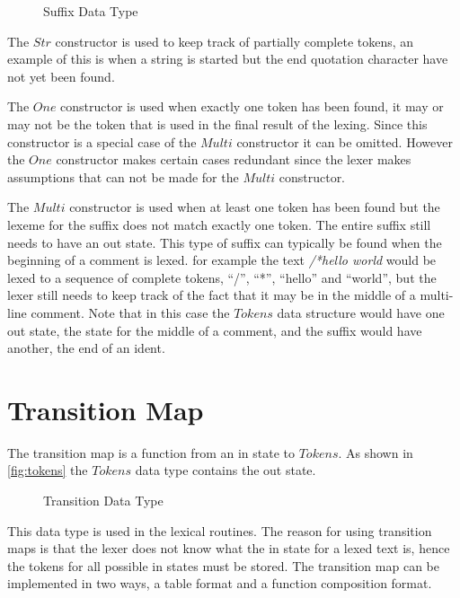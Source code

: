 \begin{figure}[h!]
  
  \caption{Suffix Data Type\label{fig:suff}}
\end{figure}

The $Str$ constructor is used to keep track of partially complete tokens, an
example of this is when a string is started but the end quotation character have
not yet been found.

The $One$ constructor is used when exactly one token has been found, it may or
may not be the token that is used in the final result of the lexing. Since this
constructor is a special case of the $Multi$ constructor it can be omitted.
However the $One$ constructor makes certain cases redundant since the lexer
makes assumptions that can not be made for the $Multi$ constructor.

The $Multi$ constructor is used when at least one token has been found but the
lexeme for the suffix does not match exactly one token. The entire suffix still
needs to have an out state. This type of suffix can typically be found when
the beginning of a comment is lexed. for example the text \emph{/*hello world}
would be lexed to a sequence of complete tokens, ``/'', ``*'', ``hello'' and
``world'', but the lexer still needs to keep track of the fact that it may be in
the middle of a multi-line comment. Note that in this case the $Tokens$ data
structure would have one out state, the state for the middle of a comment, and
the suffix would have another, the end of an ident.

\section{Transition Map}
The transition map is a function from an in state to $Tokens$. As shown in
\cref{fig:tokens} the $Tokens$ data type contains the out state.

\begin{figure}[h!]
  
  \caption{Transition Data Type \label{fig:transition}}
\end{figure}

This data type is used in the lexical routines. The reason for using transition
maps is that the lexer does not know what the in state for a lexed text is, hence
the tokens for all possible in states must be stored. The transition map can be
implemented in two ways, a table format and a function composition format.

